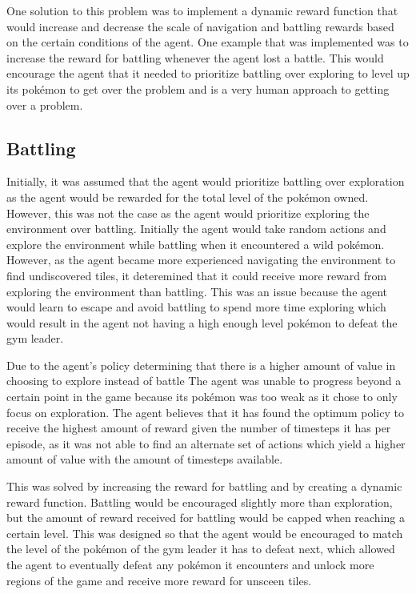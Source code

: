 One solution to this problem was to implement a dynamic reward function that would increase and decrease the scale of navigation and battling rewards based on the certain conditions of the agent. One example that was implemented was to increase the reward for battling whenever the agent lost a battle. This would encourage the agent that it needed to prioritize battling over exploring to level up its pokémon to get over the problem and is a very human approach to getting over a problem. 

\subsection{Battling}

Initially, it was assumed that the agent would prioritize battling over exploration as the agent would be rewarded for the total level of the pokémon owned. However, this was not the case as the agent would prioritize exploring the environment over battling. Initially the agent would take random actions and explore the environment while battling when it encountered a wild pokémon. However, as the agent became more experienced navigating the environment to find undiscovered tiles, it deteremined that it could receive more reward from exploring the environment than battling. This was an issue because the agent would learn to escape and avoid battling to spend more time exploring which would result in the agent not having a high enough level pokémon to defeat the gym leader. 

Due to the agent's policy determining that there is a higher amount of value in choosing to explore instead of battle The agent was unable to progress beyond a certain point in the game because its pokémon was too weak as it chose to only focus on exploration. The agent believes that it has found the optimum policy to receive the highest amount of reward given the number of timesteps it has per episode, as it was not able to find an alternate set of actions which yield a higher amount of value with the amount of timesteps available. 

This was solved by increasing the reward for battling and by creating a dynamic reward function. Battling would be encouraged slightly more than exploration, but the amount of reward received for battling would be capped when reaching a certain level. This was designed so that the agent would be encouraged to match the level of the pokémon of the gym leader it has to defeat next, which allowed the agent to eventually defeat any pokémon it encounters and unlock more regions of the game and receive more reward for unsceen tiles.

